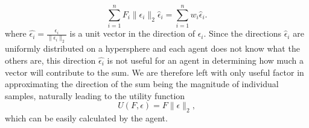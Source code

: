 \begin{equation*}
    \sum^n_{i=1} F_i \|\epsilon_i\|_2 \hat{\epsilon}_i = \sum^n_{i=1} w_i \hat{\epsilon}_i.
\end{equation*}
where $\hat{\epsilon_i} = \frac{\epsilon_i}{\|\epsilon_i\|_2}$ is a unit vector in the direction of $\epsilon_i$.
Since the directions $\hat{\epsilon}_i$ are uniformly distributed on a hypersphere \cite{UnfiormProof} and each agent does not know what the others are, this direction $\hat{\epsilon_i}$ is not useful for an agent in determining how much a vector will contribute to the sum. We are therefore left with only useful factor in approximating the direction of the sum being the magnitude of individual samples, naturally leading to the utility function
\begin{equation*}
    U(F,\epsilon) = F \|\epsilon\|_2,
\end{equation*}
which can be easily calculated by the agent.




